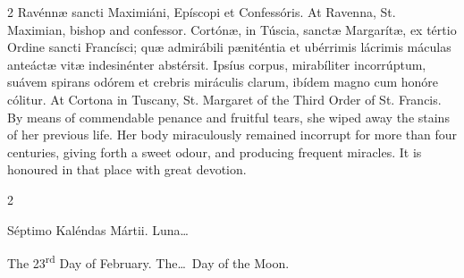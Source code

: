 \begin{paracol}{2}
Ravénnæ sancti Maximiáni, Epíscopi et 
 Confessóris.
\switchcolumn
{}
At Ravenna, St. Maximian, bishop and confessor.
\switchcolumn*
{}
Cortónæ, in Túscia, sanctæ Margarítæ, ex tértio 
 Ordine sancti Francísci; quæ admirábili pæniténtia et ubérrimis lácrimis 
 máculas anteáctæ vitæ indesinénter abstérsit. Ipsíus corpus, 
 mirabíliter incorrúptum, suávem spirans odórem et crebris miráculis clarum, 
 ibídem magno cum honóre cólitur.
\switchcolumn
{}
At Cortona in Tuscany, St. Margaret of the Third Order of St. Francis. 
 By means of commendable penance and fruitful tears, she wiped away the 
 stains of her previous life. Her body miraculously remained incorrupt 
 for more than four centuries, giving forth a sweet odour, and producing 
 frequent miracles. It is honoured in that place with great devotion.
\switchcolumn*
{}
\end{paracol}


\begin{paracol}{2}
\begin{center}{\color{gregoriocolor} Séptimo Kaléndas Mártii. 
 Luna\dots\ }\end{center}
\switchcolumn
{}
\begin{center}{\color{gregoriocolor} The 23\textsuperscript{rd} Day of 
 February. The\dots\ Day of the Moon.}\end{center}
\end{paracol}

